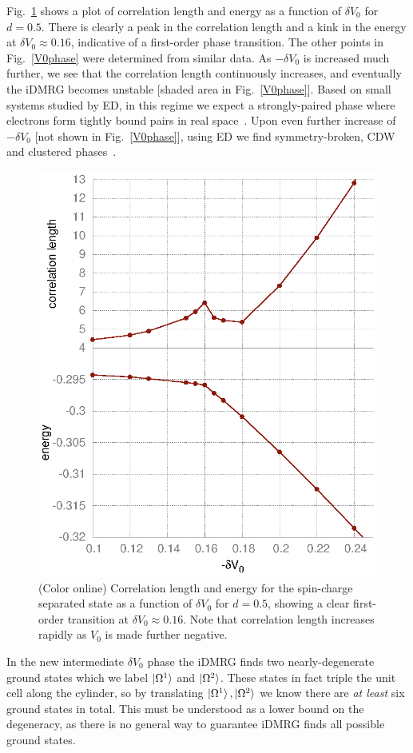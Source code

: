 Fig.~\ref{V0sweep} shows a plot of correlation length and energy as a function of $\delta V_0$ for $d=0.5$. 
There is clearly a peak in the correlation length and a kink in the energy at $\delta V_0 \approx 0.16$, indicative of a first-order phase transition.
The other points in Fig.~\ref{V0phase} were determined from similar data. 
As $-\delta V_0$ is  increased much further, we see that the correlation length continuously increases, and eventually the iDMRG becomes unstable [shaded area in Fig.~\ref{V0phase}].
Based on small systems studied by ED, in this regime we expect a strongly-paired phase where electrons form tightly bound pairs in real space~\cite{Halperin83, ReadGreen}.
Upon even further increase of $-\delta V_0$ [not shown in Fig.~\ref{V0phase}], using ED we find symmetry-broken, CDW and clustered phases~\cite{KunYang14}.

\begin{figure}
	\includegraphics[width=0.6\linewidth]{figures/t0trans.eps}
	\caption{(Color online) 
		Correlation length and energy for the spin-charge separated state as a function of $\delta V_0$ for $d=0.5$, showing a clear first-order transition at $\delta V_0 \approx 0.16$.
		Note that correlation length increases rapidly as $V_0$ is made further negative.}
	\label{V0sweep} 
\end{figure}

In the new intermediate $\delta V_0$  phase the iDMRG finds two nearly-degenerate ground states which we label $\ket{\Omega^1}$ and $\ket{\Omega^2}$.
These states in fact triple the unit cell along the cylinder, so by translating $\ket{\Omega^1}, \ket{\Omega^2}$ we know there are \emph{at least} six ground states in total.
This must be understood as a lower bound on the degeneracy, as there is no general way to guarantee  iDMRG finds all possible ground states.


